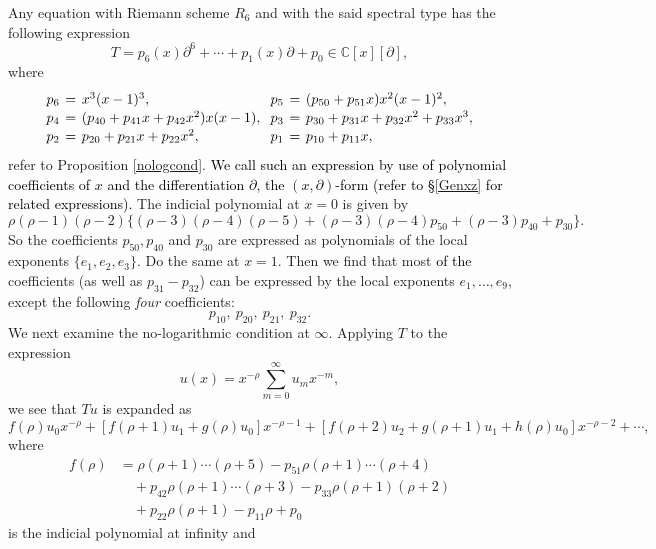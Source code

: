 \documentclass[a4paper,12pt]{article}
\theoremstyle{definition}
\theoremstyle{remark}
\numberwithin{equation}{section} %
\newcommand{\blue}[1]{\textcolor{black}{#1}}
\begin{document}
 Any equation with Riemann scheme $R_6$ and with the said spectral type
 has the following expression 
 \begin{equation}\label{eqTxdx}T=p_6(x)\partial^6+\cdots+p_1(x)\partial+p_0\in\mathbb{C}[x][\partial],\end{equation}
   where
 \begin{equation}\label{coeffT}
   \setlength{\arraycolsep}{2pt}
   \def\arraystretch{1.1}
   \begin{array}{lcllcl}
p_{6}&=& x^3(x-1)^3,&
p_{5}&=& (p_{50}+p_{51}x)x^2(x-1)^2,\\
p_{4}&=& (p_{40}+p_{41}x+p_{42}x^2)x(x-1),\ &   
p_{3}&=& p_{30}+p_{31}x+p_{32}x^2+p_{33}x^3,\\
p_{2}&=& p_{20}+p_{21}x+p_{22}x^2,&             
p_{1}&=& p_{10}+p_{11}x,
 \end{array}     \setlength{\arraycolsep}{3pt}
   \end{equation}
refer to Proposition \ref{nologcond}. \blue{We call such an expression by use of polynomial coefficients of $x$ and the differentiation $\partial$, the $(x,\partial)$-form (refer to \S \ref{Genxz} for related expressions).}
The indicial polynomial at $x=0$ is given by 
 \[\rho(\rho-1)(\rho-2)\{(\rho-3)(\rho-4)(\rho-5)
    +(\rho-3)(\rho-4)p_{50} +(\rho-3)p_{40}+p_{30}\}.\]
So the coefficients $p_{50},p_{40}$ and $p_{30}$ are expressed
as polynomials of the local exponents $\{e_1,e_2,e_3\}$.
Do the same at $x=1$. Then we find that 
most \blue{of the} coefficients (as well as $p_{31}-p_{32}$) can be expressed
by the local exponents $e_1,\dots,e_9$, except the following {\it four} coefficients:
  $$p_{10},\ p_{20},\ p_{21},\ p_{32}.$$ 
We next examine the no-logarithmic condition at $\infty$. Applying $T$ to the expression
  $$u(x)=x^{-\rho}\sum_{m=0}^\infty u_mx^{-m},$$
we see that $Tu$ is expanded as
  $$ f(\rho)u_0x^{-\rho}+[f(\rho+1)u_1+g(\rho)u_0]x^{-\rho-1}
+[f(\rho+2)u_2+g(\rho+1)u_1+h(\rho)u_0]x^{-\rho-2}+\cdots,
$$
where
\begin{equation}\label{inditialeq} \begin{aligned}
  f(\rho)
  &= \rho(\rho+1)\cdots(\rho+5)
  -p_{51}\rho(\rho+1)\cdots(\rho+4) \\
  &\quad +p_{42}\rho(\rho+1)\cdots(\rho+3) 
  -p_{33}\rho(\rho+1)(\rho+2) \\
  &\quad +p_{22}\rho(\rho+1)
  -p_{11}\rho
  +p_0 \end{aligned} 
\end{equation}
  is the indicial polynomial at infinity and
\end{document}
